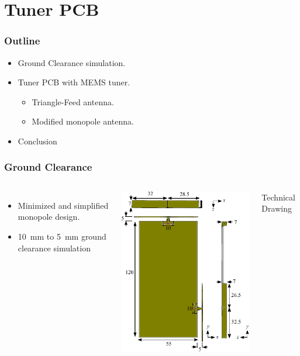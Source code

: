 \section{Tuner PCB}
\begin{frame}
  \frametitle{Outline}
      \begin{itemize}
      \item Ground Clearance simulation.
      \item Tuner PCB with MEMS tuner.
        \begin{itemize}
        \item Triangle-Feed antenna.
        \item Modified monopole antenna.
        \end{itemize}
      \item Conclusion
      \end{itemize}
\end{frame}

\begin{frame}[fragile]
  \frametitle{Ground Clearance}
  \begin{columns}[onlytextwidth,t]
      \begin{itemize}
      \item Minimized and simplified monopole design.
      \item \SI{10}{mm} to \SI{5}{mm} ground clearance simulation
      \end{itemize}
    \begin{center}
      \includegraphics[scale=0.7]{img/Lasse/3d_drawing_mini.pdf}
    \end{center}
    Technical Drawing
  \end{columns}
\end{frame}

